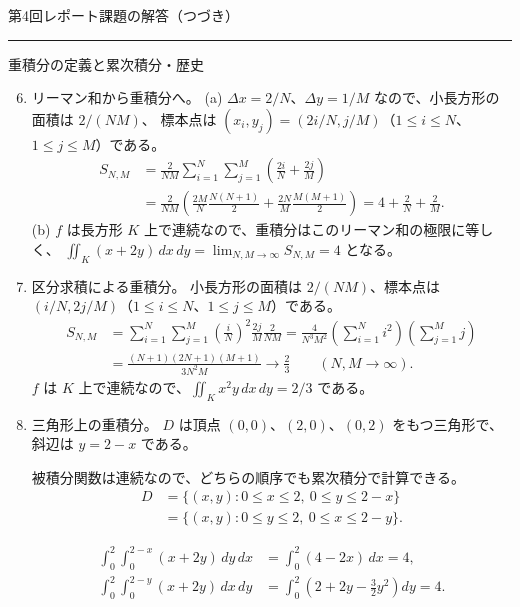 \documentclass[a4paper,10pt,pdflatex,ja=standard,jafont=ipaex-type1,
  magstyle=real,scale=1]{bxjsarticle}
\newcommand{\handouttitle}[1]{%
  \begin{center}
    {\Large\mdseries\color{ink}#1}\par\vspace{3mm}
    {\color{accent}\rule{0.88\linewidth}{0.7pt}}
  \end{center}\vspace{-2mm}}
\newcommand{\topic}[1]{\par\vspace{5pt}%
  {\large\sffamily\mdseries\color{accent}#1}\par\vspace{2pt}}
\newenvironment{problems}
  {\begin{enumerate}[leftmargin=2.4em,itemsep=3pt,topsep=3pt,parsep=0pt,
    font=\color{accent}]}
  {\end{enumerate}}
\newcommand{\problemlabel}[1]{{\sffamily\mdseries\color{ink}#1}}
\begin{document}
\newpage
\handouttitle{第4回\quad レポート課題の解答（つづき）}
\topic{重積分の定義と累次積分・歴史}
\begin{problems}
\setcounter{enumi}{5}
\setlength{\itemsep}{5pt}
\item \problemlabel{リーマン和から重積分へ。}
(a) $\Delta x=2/N$、$\Delta y=1/M$ なので、小長方形の面積は $2/(NM)$、
標本点は $(x_i,y_j)=(2i/N,j/M)$（$1\le i\le N$、$1\le j\le M$）である。
$$
 \begin{aligned}
 S_{N,M}
 &=\frac{2}{NM}\sum_{i=1}^N\sum_{j=1}^M
    \left(\frac{2i}{N}+\frac{2j}{M}\right)\\
 &=\frac{2}{NM}\left(\frac{2M}{N}\frac{N(N+1)}2
                +\frac{2N}{M}\frac{M(M+1)}2\right)
 =4+\frac2N+\frac2M.
 \end{aligned}
$$
(b) $f$ は長方形 $K$ 上で連続なので、重積分はこのリーマン和の極限に等しく、
$\iint_K(x+2y)\,dx\,dy=\lim_{N,M\to\infty}S_{N,M}=4$ となる。

\item \problemlabel{区分求積による重積分。}
小長方形の面積は $2/(NM)$、標本点は $(i/N,2j/M)$（$1\le i\le N$、$1\le j\le M$）である。
$$
 \begin{aligned}
 S_{N,M}
 &=\sum_{i=1}^N\sum_{j=1}^M
   \left(\frac{i}{N}\right)^2\frac{2j}{M}\frac{2}{NM}
 =\frac{4}{N^3M^2}\left(\sum_{i=1}^Ni^2\right)\left(\sum_{j=1}^Mj\right)\\
 &=\frac{(N+1)(2N+1)(M+1)}{3N^2M}
 \longrightarrow\frac23\qquad(N,M\to\infty).
 \end{aligned}
$$
$f$ は $K$ 上で連続なので、$\iint_Kx^2y\,dx\,dy=2/3$ である。

\item \problemlabel{三角形上の重積分。}
$D$ は頂点 $(0,0)$、$(2,0)$、$(0,2)$ をもつ三角形で、斜辺は $y=2-x$ である。
\par\noindent
\begin{minipage}[c]{0.26\linewidth}\centering
{}
\end{minipage}\hfill
\begin{minipage}[c]{0.71\linewidth}
被積分関数は連続なので、どちらの順序でも累次積分で計算できる。
$$
 \begin{aligned}
 D&=\{(x,y):0\le x\le2,\ 0\le y\le2-x\}\\
  &=\{(x,y):0\le y\le2,\ 0\le x\le2-y\}.
 \end{aligned}
$$
\end{minipage}\par
$$
 \begin{aligned}
 \int_0^2\!\int_0^{2-x}(x+2y)\,dy\,dx
 &=\int_0^2(4-2x)\,dx=4,\\
 \int_0^2\!\int_0^{2-y}(x+2y)\,dx\,dy
 &=\int_0^2\left(2+2y-\frac32y^2\right)dy=4.
 \end{aligned}
$$


\end{problems}
\end{document}
